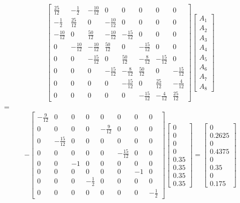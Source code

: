 \documentclass[a4paper, 12pt]{article}
\begin{document}
\[
\begin{bmatrix}
\frac{25}{12} & -\frac{1}{2} & -\frac{10}{12} & 0 & 0 & 0 & 0 & 0 \\
-\frac{1}{2} & \frac{25}{12} & 0 & -\frac{10}{12} & 0 & 0 & 0 & 0 \\
-\frac{10}{12} & 0 & \frac{50}{12} & -\frac{10}{12} & -\frac{15}{12} & 0 & 0 & 0 \\
0 & -\frac{10}{12} & -\frac{10}{12} & \frac{50}{12} & 0 & -\frac{15}{12} & 0 & 0 \\
0 & 0 & -\frac{15}{12} & 0 & \frac{50}{12} & -\frac{8}{12} & -\frac{15}{12} & 0 \\
0 & 0 & 0 & -\frac{15}{12} & -\frac{8}{12} & \frac{50}{12} & 0 & -\frac{15}{12} \\
0 & 0 & 0 & 0 & -\frac{15}{12} & 0 & \frac{25}{12} & -\frac{4}{12} \\
0 & 0 & 0 & 0 & 0 & -\frac{15}{12} & -\frac{4}{12} & \frac{25}{12}
\end{bmatrix}
\begin{bmatrix}
A_1 \\ A_2 \\ A_3 \\ A_4 \\ A_5 \\ A_6 \\ A_7 \\ A_8
\end{bmatrix}\]
=
\[
-
\begin{bmatrix}
-\frac{9}{12} & 0 & 0 & 0 & 0 & 0 & 0 & 0 \\
0 & 0 & 0 & 0 & -\frac{9}{12} & 0 & 0 & 0 \\
0 & -\frac{15}{12} & 0 & 0 & 0 & 0 & 0 & 0 \\
0 & 0 & 0 & 0 & 0 & -\frac{15}{12} & 0 & 0 \\
0 & 0 & -1 & 0 & 0 & 0 & 0 & 0 \\
0 & 0 & 0 & 0 & 0 & 0 & -1 & 0 \\
0 & 0 & 0 & -\frac{1}{2} & 0 & 0 & 0 & 0 \\
0 & 0 & 0 & 0 & 0 & 0 & 0 & -\frac{1}{2}
\end{bmatrix}
\begin{bmatrix}
0 \\ 0 \\ 0 \\ 0 \\ 0.35 \\ 0.35 \\ 0.35 \\ 0.35
\end{bmatrix}
=
\begin{bmatrix}
0 \\
0.2625 \\
0 \\
0.4375 \\
0 \\
0.35 \\
0 \\
0.175
\end{bmatrix}
\]
\end{document}
